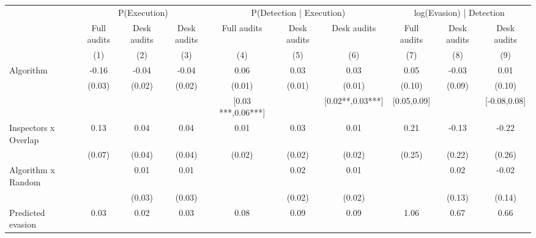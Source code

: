 \begin{tabular}{lccc|ccc|ccc} \toprule
\multicolumn{1}{l}{} & \multicolumn{3}{c}{P(Execution)} & \multicolumn{3}{c}{P(Detection | Execution)} & \multicolumn{3}{c}{log(Evasion) | Detection} \\\cmidrule(lr){2-4}\cmidrule(lr){5-7}\cmidrule(lr){8-10} \multicolumn{1}{l}{} & Full audits & Desk audits & Desk audits & Full audits & Desk audits & Desk audits & Full audits & Desk audits & Desk audits \\ \multicolumn{1}{l}{} & (1) & (2) & (3) & (4) & (5) & (6) & (7) & (8) & (9) \\ \midrule
Algorithm   &       -0.16\sym{***}&       -0.04\sym{**} &       -0.04\sym{**} &        0.06\sym{***}&        0.03\sym{***}&        0.03\sym{***}&        0.05         &       -0.03         &        0.01         \\
            &      (0.03)         &      (0.02)         &      (0.02)         &      (0.01)         &      (0.01)         &      (0.01)         &      (0.10)         &      (0.09)         &      (0.10)         \\
\addlinespace
 & & & & [0.03 ***,0.06***] & & [0.02**,0.03***] & [0.05,0.09] & & [-0.08,0.08] \\  Inspectors x Overlap&        0.13\sym{*}  &        0.04         &        0.04         &        0.01         &        0.03         &        0.01         &        0.21         &       -0.13         &       -0.22         \\
            &      (0.07)         &      (0.04)         &      (0.04)         &      (0.02)         &      (0.02)         &      (0.02)         &      (0.25)         &      (0.22)         &      (0.26)         \\
\addlinespace
Algorithm x Random&                     &        0.01         &        0.01         &                     &        0.02         &        0.01         &                     &        0.02         &       -0.02         \\
            &                     &      (0.03)         &      (0.03)         &                     &      (0.02)         &      (0.02)         &                     &      (0.13)         &      (0.14)         \\
\addlinespace
Predicted evasion&        0.03\sym{***}&        0.02\sym{***}&        0.03\sym{***}&        0.08\sym{***}&        0.09\sym{***}&        0.09\sym{***}&        1.06\sym{***}&        0.67\sym{***}&        0.66\sym{***}\\

\end{tabular}
